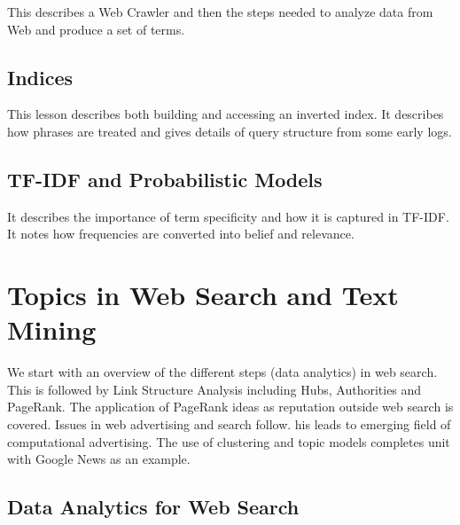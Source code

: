 This describes a Web Crawler and then the steps needed to analyze data
from Web and produce a set of terms.



\subsection{Indices}


This lesson describes both building and accessing an inverted index. It
describes how phrases are treated and gives details of query structure
from some early logs.



\subsection{TF-IDF and Probabilistic Models}


It describes the importance of term specificity and how it is captured
in TF-IDF. It notes how frequencies are converted into belief and
relevance.


\section{Topics in Web Search and Text Mining}


We start with an overview of the different steps (data analytics) in web
search. This is followed by Link Structure Analysis including Hubs,
Authorities and PageRank. The application of PageRank ideas as
reputation outside web search is covered. Issues in web advertising and
search follow. his leads to emerging field of computational advertising.
The use of clustering and topic models completes unit with Google News
as an example.



\subsection{Data Analytics for Web Search}\label{data-analytics-for-web-search}


